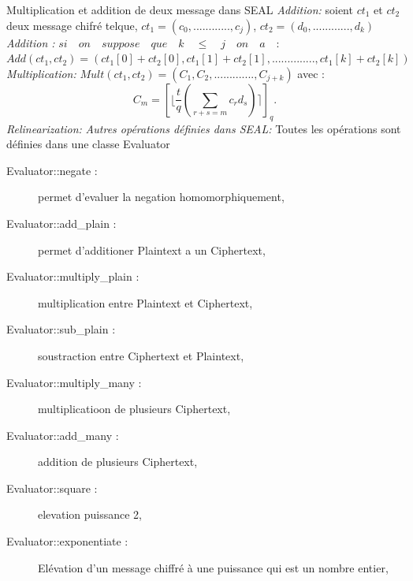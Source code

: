 \documentclass[a4paper,11pt]{report}
\begin{document}
Multiplication et addition de deux message dans SEAL\newline
\textit{Addition:}\newline
soient $ct_1$ et $ct_2$ deux message chifré telque,\newline
$ct_1 = (c_0,............,c_j)$, $ct_2 = (d_0,............,d_k)$
\newline
\textit{Addition : }\newline
\newline
$si\quad on\quad suppose\quad que\quad k\quad \leq \quad j\quad on\quad a \quad:$\newline
\newline
$Add(ct_1, ct_2) = (ct_1[0]+ct_2[0],ct_1[1]+ct_2[1],..............,ct_1[k]+ct_2[k])$\newline
\newline
\textit{Multiplication:}\newline
\newline
$Mult(ct_1, ct_2) = (C_1,C_2,............., C_{j+k})$ avec :\newline
$$C_m = [\lfloor\dfrac{t}{q}(\sum_{r+s=m}^{}c_rd_s)\rceil]_q.$$
\textit{Relinearization:}\newline
\newline
\textit{Autres opérations définies dans SEAL:}\newline
Toutes les opérations sont définies dans une classe Evaluator\newline
\begin{description}
 \item[Evaluator::negate :] permet d'evaluer la negation homomorphiquement,
 \item[Evaluator::add\_plain :] permet d'additioner Plaintext a un Ciphertext,
 \item[Evaluator::multiply\_plain :] multiplication entre Plaintext et Ciphertext,
 \item[Evaluator::sub\_plain :] soustraction entre Ciphertext et Plaintext,
 \item[Evaluator::multiply\_many :] multiplicatioon de plusieurs Ciphertext,
 \item[Evaluator::add\_many :] addition de plusieurs Ciphertext,
 \item[Evaluator::square :] elevation puissance 2,
 \item[Evaluator::exponentiate :] Elévation d'un message chiffré à une puissance qui est un nombre entier,
  \end{description}
\end{document}
